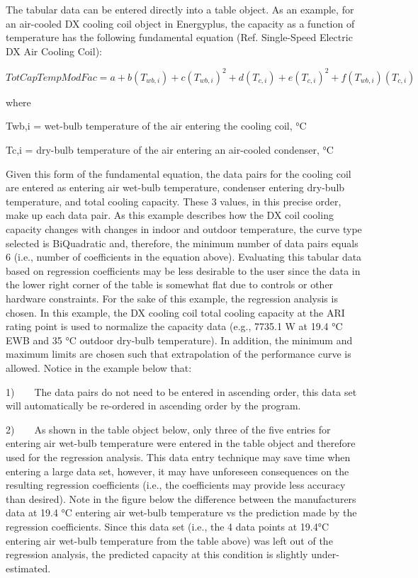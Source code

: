 The tabular data can be entered directly into a table object. As an example, for an air-cooled DX cooling coil object in Energyplus, the capacity as a function of temperature has the following fundamental equation (Ref. Single-Speed Electric DX Air Cooling Coil):

\begin{equation}
TotCapTempModFac = a + b\left( {{T_{wb,i}}} \right) + c{\left( {{T_{wb,i}}} \right)^2} + d\left( {{T_{c,i}}} \right) + e{\left( {{T_{c,i}}} \right)^2} + f\left( {{T_{wb,i}}} \right)\left( {{T_{c,i}}} \right)
\end{equation}

where

Twb,i = wet-bulb temperature of the air entering the cooling coil, °C

Tc,i = dry-bulb temperature of the air entering an air-cooled condenser, °C

Given this form of the fundamental equation, the data pairs for the cooling coil are entered as entering air wet-bulb temperature, condenser entering dry-bulb temperature, and total cooling capacity. These 3 values, in this precise order, make up each data pair. As this example describes how the DX coil cooling capacity changes with changes in indoor and outdoor temperature, the curve type selected is BiQuadratic and, therefore, the minimum number of data pairs equals 6 (i.e., number of coefficients in the equation above). Evaluating this tabular data based on regression coefficients may be less desirable to the user since the data in the lower right corner of the table is somewhat flat due to controls or other hardware constraints. For the sake of this example, the regression analysis is chosen. In this example, the DX cooling coil total cooling capacity at the ARI rating point is used to normalize the capacity data (e.g., 7735.1 W at 19.4 °C EWB and 35 °C outdoor dry-bulb temperature). In addition, the minimum and maximum limits are chosen such that extrapolation of the performance curve is allowed. Notice in the example below that:

1)~~~~The data pairs do not need to be entered in ascending order, this data set will automatically be re-ordered in ascending order by the program.

2)~~~~As shown in the table object below, only three of the five entries for entering air wet-bulb temperature were entered in the table object and therefore used for the regression analysis. This data entry technique may save time when entering a large data set, however, it may have unforeseen consequences on the resulting regression coefficients (i.e., the coefficients may provide less accuracy than desired). Note in the figure below the difference between the manufacturers data at 19.4 °C entering air wet-bulb temperature vs the prediction made by the regression coefficients. Since this data set (i.e., the 4 data points at 19.4°C entering air wet-bulb temperature from the table above) was left out of the regression analysis, the predicted capacity at this condition is slightly under-estimated.

